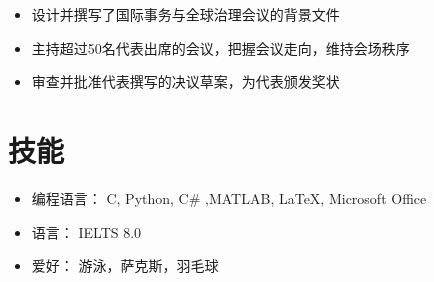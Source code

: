 \documentclass{resume}
\begin{document}
\begin{itemize}
  \item 设计并撰写了国际事务与全球治理会议的背景文件
  \item 主持超过50名代表出席的会议，把握会议走向，维持会场秩序
  \item 审查并批准代表撰写的决议草案，为代表颁发奖状
\end{itemize}

\section{技能}
\begin{itemize}[parsep=0.5ex]
  \item 编程语言： C, Python, C\# ,MATLAB, \LaTeX, Microsoft Office
  \item 语言： IELTS 8.0
  \item 爱好： 游泳，萨克斯，羽毛球 %
\end{itemize}
\end{document}
